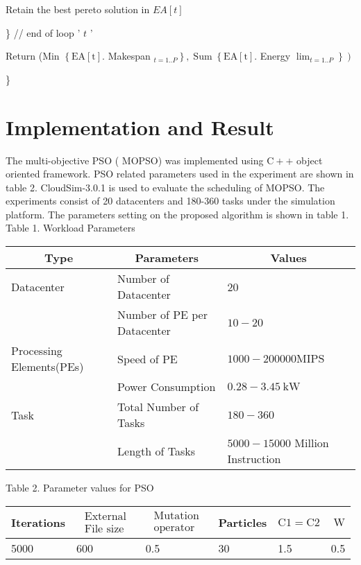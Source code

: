 \documentclass[10pt]{article}
\begin{document}
Retain the best pereto solution in $E A[t]$

\} // end of loop ' $t$ '

Return (Min $\left\{\mathrm{EA}[\mathrm{t}]\right.$. Makespan $\left._{t=1 . . P}\right\}, \operatorname{Sum}\left\{\mathrm{EA}[\mathrm{t}]\right.$. Energy $\left.\left.\lim _{t=1 . . P}\right\}\right)$

\}

\section{Implementation and Result}
The multi-objective PSO ( MOPSO) was implemented using $\mathrm{C}++$ object oriented framework. PSO related parameters used in the experiment are shown in table 2. CloudSim-3.0.1 is used to evaluate the scheduling of MOPSO. The experiments consist of 20 datacenters and 180-360 tasks under the simulation platform. The parameters setting on the proposed algorithm is shown in table 1. Table 1. Workload Parameters

\begin{center}
\begin{tabular}{|l|l|l|}
\hline
\multicolumn{1}{|c|}{Type} & \multicolumn{1}{|c|}{Parameters} & \multicolumn{1}{c|}{Values} \\
\hline
Datacenter & Number of Datacenter & 20 \\
\hline
 & Number of PE per Datacenter & $10-20$ \\
\hline
Processing Elements(PEs) & Speed of PE & $1000-200000 \mathrm{MIPS}$ \\
\hline
 & Power Consumption & $0.28-3.45 \mathrm{~kW}$ \\
\hline
Task & Total Number of Tasks & $180-360$ \\
\hline
 & Length of Tasks & $5000-15000$ Million Instruction \\
\hline
\end{tabular}
\end{center}

Table 2. Parameter values for PSO

\begin{center}
\begin{tabular}{|l|l|l|l|l|l|}
\hline
Iterations & $\begin{array}{l}\text { External } \\ \text { File size }\end{array}$ & $\begin{array}{l}\text { Mutation } \\ \text { operator }\end{array}$ & Particles & $\mathrm{C} 1=\mathrm{C} 2$ & $\mathrm{~W}$ \\
\hline
5000 & 600 & 0.5 & 30 & 1.5 & 0.5 \\
\hline
\end{tabular}
\end{center}
\end{document}
